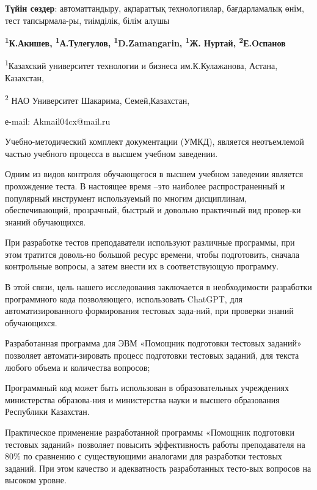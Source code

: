 {\bfseries Түйін сөздер}: автоматтандыру, ақпараттық технологиялар,
бағдарламалық өнім, тест тапсырмала-ры, тиімділік, білім алушы



\begin{center}

{\bfseries \textsuperscript{1}К.Акишев\envelope,
\textsuperscript{1}А.Тулегулов, \textsuperscript{1}D.Zamangarin,
\textsuperscript{1}Ж. Нуртай, \textsuperscript{2}Е.Oспанов}

\textsuperscript{1}Казахский университет технологии и бизнеса
им.К.Кулажанова, Астана, Казахстан,

\textsuperscript{2} НАО Университет Шакарима, Семей,Казахстан,

е-mail: Akmail04cx@mail.ru
\end{center}

Учебно-методический комплект документации (УМКД), является неотъемлемой
частью учебного процесса в высшем учебном заведении.

Одним из видов контроля обучающегося в высшем учебном заведении является
прохождение теста. В настоящее время --это наиболее распространенный и
популярный инструмент используемый по многим дисциплинам,
обеспечивающий, прозрачный, быстрый и довольно практичный вид провер-ки
знаний обучающихся.

При разработке тестов преподаватели используют различные программы, при
этом тратится доволь-но большой ресурс времени, чтобы подготовить,
сначала контрольные вопросы, а затем внести их в соответствующую
программу.

В этой связи, цель нашего исследования заключается в необходимости
разработки программного кода позволяющего, использовать ChatGPT, для
автоматизированного формирования тестовых зада-ний, при проверки знаний
обучающихся.

Разработанная программа для ЭВМ «Помощник подготовки тестовых заданий»
позволяет автомати-зировать процесс подготовки тестовых заданий, для
текста любого объема и количества вопросов;

Программный код может быть использован в образовательных учреждениях
министерства образова-ния и министерства науки и высшего образования
Республики Казахстан.

Практическое применение разработанной программы «Помощник подготовки
тестовых заданий» позволяет повысить эффективность работы преподавателя
на 80\% по сравнению с существующими аналогами для разработки тестовых
заданий. При этом качество и адекватность разработанных тесто-вых
вопросов на высоком уровне.

